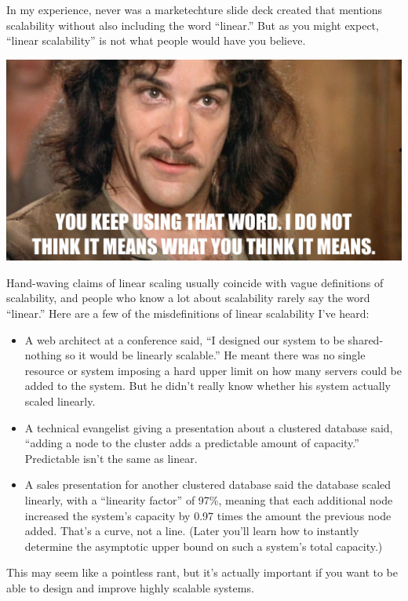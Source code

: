 \documentclass{vivid_layout}
\begin{document}
In my experience, never was a marketechture slide deck created that mentions
scalability without also including the word ``linear.'' But as you might expect,
``linear scalability'' is not what people would have you believe.
\begin{center}
\includegraphics[width=.85\linewidth]{scalability/inigo}
\end{center}

Hand-waving claims of linear scaling usually coincide with vague definitions
of scalability, and people who know a lot about scalability rarely say the word
``linear.'' Here are a few of the misdefinitions of linear scalability I've heard:

\begin{itemize}
\item A web architect at a conference said, ``I designed our system to be
shared-nothing so it would be linearly scalable.'' He meant there was no
single resource or system imposing a hard upper limit on how many servers could
be added to the system. But he didn't really know whether his system actually
scaled linearly.
\item A technical evangelist giving a presentation about a clustered database
said, ``adding a node to the cluster adds a predictable amount of capacity.''
Predictable isn't the same as linear.
\item A sales presentation for another clustered database said the database
scaled linearly, with a ``linearity factor'' of 97\%, meaning that each
additional node increased the system's capacity by 0.97 times the amount the
previous node added. That's a curve, not a line.  (Later you'll learn how to
instantly determine the asymptotic upper bound on such a system's total
capacity.)
\end{itemize}

This may seem like a pointless rant, but it's actually important if you want to
be able to design and improve highly scalable systems.
\end{document}
